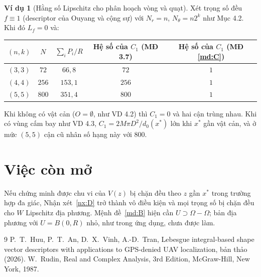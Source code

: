 \documentclass[12pt,a4paper]{article}
\theoremstyle{plain}
\theoremstyle{definition}
\newtheorem{vd}{Ví dụ}
\begin{document}
\begin{vd}[Hằng số Lipschitz cho phân hoạch vòng và quạt]\label{vd:const}
Xét trọng số đều $f\equiv1$ (descriptor của Ouyang và cộng sự) với $N_r=n$, $N_\theta=n2^k$ như Mục 4.2. Khi đó $L_f=0$ và:

\begin{center}
\begin{tabular}{@{}ccccc@{}}
\toprule
$(n,k)$ & $N$ & $\sum_iP_i/R$ & Hệ số của $C_1$ (MĐ 3.7) & Hệ số của $C_1$ (MĐ \ref{md:C}) \\
\midrule
$(3,3)$ & $72$  & $66{,}8$  & $72$  & $1$ \\
$(4,4)$ & $256$ & $153{,}1$ & $256$ & $1$ \\
$(5,5)$ & $800$ & $351{,}4$ & $800$ & $1$ \\
\bottomrule
\end{tabular}
\end{center}

Khi không có vật cản ($O=\emptyset$, như VD 4.2) thì $C_1=0$ và hai cận trùng nhau. Khi có vùng cấm bay như VD 4.3, $C_1=2M\pi D^2/d_0(x^*)$ lớn khi $x^*$ gần vật cản, và ở mức $(5,5)$ cận cũ nhân số hạng này với $800$.
\end{vd}

\section{Việc còn mở}

Nếu chứng minh được chu vi của $V(z)$ bị chặn đều theo $z$ gần $x^*$ trong trường hợp đa giác, Nhận xét~\ref{nx:D} trở thành vô điều kiện và mọi trọng số bị chặn đều cho $W$ Lipschitz địa phương. Mệnh đề~\ref{md:B} hiện cần $U\supset\Omega-\Omega$; bản địa phương với $U=B(0,R)$ nhỏ, như trong ứng dụng, chưa được làm.

\begin{thebibliography}{9}
 P.~T.~Huu, P.~T.~An, D.~X.~Vinh, A.-D.~Tran, Lebesgue integral-based shape vector descriptors with applications to GPS-denied UAV localization, bản thảo (2026).
 W.~Rudin, Real and Complex Analysis, 3rd Edition, McGraw-Hill, New York, 1987.
\end{thebibliography}
\end{document}
